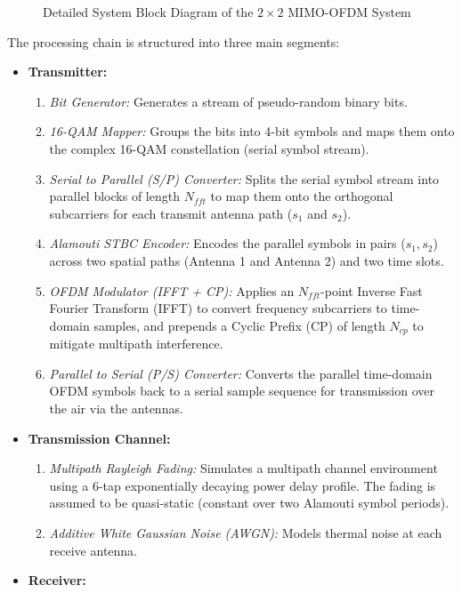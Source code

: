 \documentclass[a4paper]{article}
\begin{document}
\begin{figure}[H]
{\begin{tikzpicture}
\end{tikzpicture}%
}
\caption{Detailed System Block Diagram of the $2 \times 2$ MIMO-OFDM System}
\label{fig:block_diagram}
\end{figure}
\cleardoublepage

The processing chain is structured into three main segments:
\begin{itemize}
    \item \textbf{Transmitter:} 
    \begin{enumerate}
        \item \textit{Bit Generator:} Generates a stream of pseudo-random binary bits.
        \item \textit{16-QAM Mapper:} Groups the bits into 4-bit symbols and maps them onto the complex 16-QAM constellation (serial symbol stream).
        \item \textit{Serial to Parallel (S/P) Converter:} Splits the serial symbol stream into parallel blocks of length $N_{fft}$ to map them onto the orthogonal subcarriers for each transmit antenna path ($s_1$ and $s_2$).
        \item \textit{Alamouti STBC Encoder:} Encodes the parallel symbols in pairs ($s_1, s_2$) across two spatial paths (Antenna 1 and Antenna 2) and two time slots.
        \item \textit{OFDM Modulator (IFFT + CP):} Applies an $N_{fft}$-point Inverse Fast Fourier Transform (IFFT) to convert frequency subcarriers to time-domain samples, and prepends a Cyclic Prefix (CP) of length $N_{cp}$ to mitigate multipath interference.
        \item \textit{Parallel to Serial (P/S) Converter:} Converts the parallel time-domain OFDM symbols back to a serial sample sequence for transmission over the air via the antennas.
    \end{enumerate}
    \item \textbf{Transmission Channel:}
    \begin{enumerate}
        \item \textit{Multipath Rayleigh Fading:} Simulates a multipath channel environment using a 6-tap exponentially decaying power delay profile. The fading is assumed to be quasi-static (constant over two Alamouti symbol periods).
        \item \textit{Additive White Gaussian Noise (AWGN):} Models thermal noise at each receive antenna.
    \end{enumerate}
    \item \textbf{Receiver:}

\end{itemize}
\end{document}
